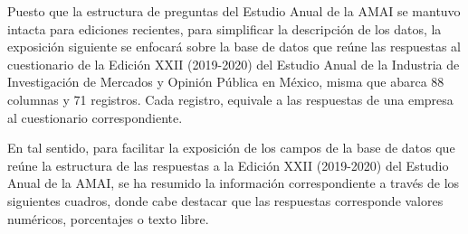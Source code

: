 Puesto que la estructura de preguntas del Estudio Anual de la AMAI se mantuvo intacta para ediciones recientes, para simplificar la descripción de los datos, la exposición siguiente se enfocará sobre la base de datos que reúne las respuestas al cuestionario de la Edición XXII (2019-2020) del Estudio Anual de la Industria de Investigación de Mercados y Opinión Pública en México, misma que abarca 88 columnas y 71 registros. Cada registro, equivale a las respuestas de una empresa al cuestionario correspondiente.

En tal sentido, para facilitar la exposición de los campos de la base de datos que reúne la estructura de las respuestas a la Edición XXII (2019-2020) del Estudio Anual de la AMAI, se ha resumido la información correspondiente a través de los siguientes cuadros, donde cabe destacar que las respuestas corresponde valores numéricos, porcentajes o texto libre.


